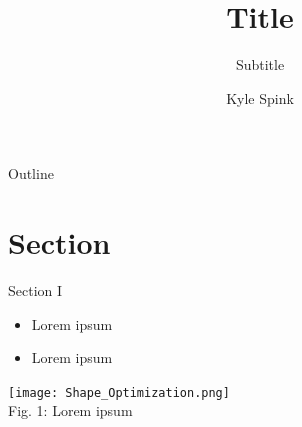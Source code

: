 \documentclass[aspectratio=43, 10pt]{beamer} %
\title[Beamer template]{Title}
\subtitle{Subtitle}
\author{Kyle Spink}
\institute{}
\date{}
\begin{document}
\begin{frame}
    \titlepage
\end{frame}


\begin{frame}[t]{Outline}
    \tableofcontents[hideallsubsections]
    \vspace{-1.5em} %
\end{frame}

\section{Section}
\begin{frame}[t]{Section I}
    \small 
    \begin{itemize}
        \item Lorem ipsum
        \item Lorem ipsum
    \end{itemize}
    \vspace*{0.875in}
    \begin{center}
        \texttt{[image: Shape\_Optimization.png]}
        \\
        \vspace*{0.1in}
        \scriptsize Fig. 1: Lorem ipsum
    \end{center}
\end{frame}
\end{document}
